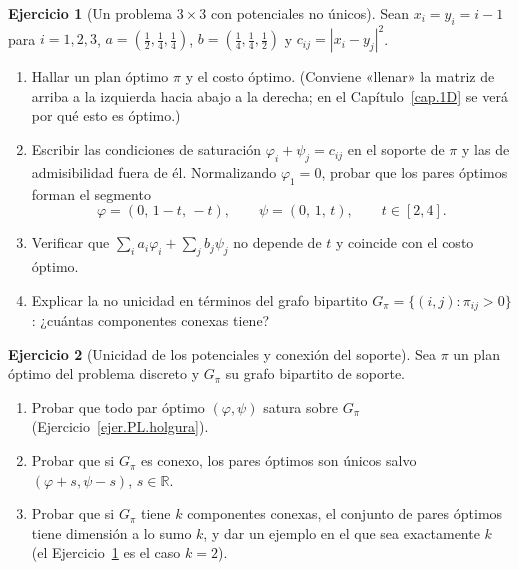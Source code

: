 \documentclass[12pt, a4paper]{amsbook}
\newcommand{\R}{{\mathbb R}}
\theoremstyle{remark}
\theoremstyle{definition}
\newtheorem{ejercicio}{Ejercicio}[chapter]
\numberwithin{section}{chapter}
\numberwithin{subsection}{section}
\numberwithin{equation}{section}
\numberwithin{figure}{chapter}
\begin{document}
\begin{ejercicio}[Un problema $3\times3$ con potenciales no únicos]\label{ejer.discreto.3x3}
Sean $x_i=y_i=i-1$ para $i=1,2,3$, $a=(\tfrac12,\tfrac14,\tfrac14)$,
$b=(\tfrac14,\tfrac14,\tfrac12)$ y $c_{ij}=|x_i-y_j|^2$.
\begin{enumerate}[label=(\alph*)]
\item Hallar un plan óptimo $\pi$ y el costo óptimo. (Conviene «llenar»
la matriz de arriba a la izquierda hacia abajo a la derecha; en el
Capítulo~\ref{cap.1D} se verá por qué esto es óptimo.)
\item Escribir las condiciones de saturación $\varphi_i+\psi_j=c_{ij}$ en el
soporte de $\pi$ y las de admisibilidad fuera de él. Normalizando
$\varphi_1=0$, probar que los pares óptimos forman el segmento
\[
\varphi=(0,\,1-t,\,-t),\qquad\psi=(0,\,1,\,t),\qquad t\in[2,4].
\]
\item Verificar que $\sum_ia_i\varphi_i+\sum_jb_j\psi_j$ no depende de $t$ y
coincide con el costo óptimo.
\item Explicar la no unicidad en términos del grafo bipartito
$G_\pi=\{(i,j):\pi_{ij}>0\}$: ¿cuántas componentes conexas tiene?
\end{enumerate}
\end{ejercicio}

\begin{ejercicio}[Unicidad de los potenciales y conexión del soporte]\label{ejer.discreto.unicidad}
Sea $\pi$ un plan óptimo del problema discreto y $G_\pi$ su grafo bipartito
de soporte.
\begin{enumerate}[label=(\alph*)]
\item Probar que todo par óptimo $(\varphi,\psi)$ satura sobre $G_\pi$
(Ejercicio~\ref{ejer.PL.holgura}).
\item Probar que si $G_\pi$ es conexo, los pares óptimos son únicos salvo
$(\varphi+s,\psi-s)$, $s\in\R$.
\item Probar que si $G_\pi$ tiene $k$ componentes conexas, el conjunto de
pares óptimos tiene dimensión a lo sumo $k$, y dar un ejemplo en el que sea
exactamente $k$ (el Ejercicio~\ref{ejer.discreto.3x3} es el caso $k=2$).
\end{enumerate}
\end{ejercicio}
\end{document}
